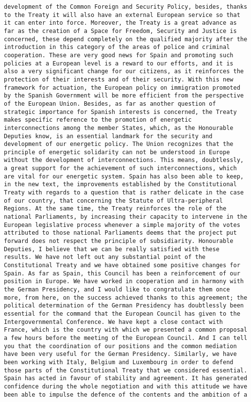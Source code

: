 \documentclass[
]{article}
\begin{document}
\begin{verbatim}
development of the Common Foreign and Security Policy, besides, thanks to the Treaty it will also have an external European service so that it can enter into force. Moreover, the Treaty is a great advance as far as the creation of a Space for Freedom, Security and Justice is concerned, these depend completely on the qualified majority after the introduction in this category of the areas of police and criminal cooperation. These are very good news for Spain and promoting such policies at a European level is a reward to our efforts, and it is also a very significant change for our citizens, as it reinforces the protection of their interests and of their security. With this new framework for actuation, the European policy on immigration promoted by the Spanish Government will be more efficient from the perspective of the European Union. Besides, as far as another question of strategic importance for Spanish interests is concerned, the Treaty makes specific reference to the promotion of energetic interconnections among the member States, which, as the Honourable Deputies know, is an essential landmark for the security and development of our energetic policy. The Union recognizes that the principle of energetic solidarity can not be understood in Europe without the development of interconnections. This means, doubtlessly, a great support for the achievement of such interconnections, which are vital for our energetic system. Spain has also been able to keep, in the new text, the improvements established by the Constitutional Treaty with regards to a question that is rather delicate in the case of our country, that concerning the Statute of Ultra-peripheral Regions. At the same time, the Treaty reinforces the role of the national Parliaments, by increasing their capacity to intervene in the European legislative process whenever a simple majority of the votes attributed to those national Parliaments deems that the project put forward does not respect the principle of subsidiarity. Honourable Deputies, I believe that we can be really satisfied with these results. We have not left out any substantial point of the Constitutional Treaty and we have obtained some positive changes for Spain. As far as Spain, this Council has been a reinforcement of our position in Europe. We have worked in cooperation and in harmony with the German Presidency, and I would like to congratulate them once more, from here, on the success achieved thanks to this agreement; the political determination of the German Presidency has doubtlessly been essential for the command that the European Council has given to the Intergovernmental Conference. We have kept a close contact with France, which is the country with which we presented a common proposal a few hours before the meeting of the European Council. And I can tell you that the coordination of our positions and the common mediation have been very useful for the German Presidency. Similarly, we have been working with Italy, Belgium and Luxembourg in order to defend those parts of the Constitutional Treaty that we considered essential. Spain has acted in favour of stability and agreement. It has generated confidence during the whole negotiation and with this attitude we have been able to impulse the defence of the contents and the ambition of a 
\end{verbatim}
\end{document}
